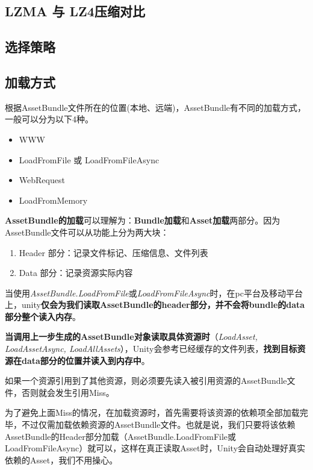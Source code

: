 \documentclass[UTF8,a4paper,12pt]{ctexbook}
\begin{document}
			\subsection{LZMA 与 LZ4压缩对比}
			
			\subsection{选择策略}
			
		\subsection{加载方式}   
			根据AssetBundle文件所在的位置(本地、远端)，AssetBundle有不同的加载方式，一般可以分为以下4种。
			\begin{itemize}
				\item WWW
				\item LoadFromFile 或 LoadFromFileAsync
				\item WebRequest
				\item LoadFromMemory
			\end{itemize} 
			
			\textbf{AssetBundle的加载}可以理解为：\textbf{Bundle加载}和\textbf{Asset加载}两部分。因为AssetBundle文件可以从功能上分为两大块：
			\begin{enumerate}
				\item Header 部分：记录文件标记、压缩信息、文件列表
				\item Data 部分：记录资源实际内容
			\end{enumerate}
			
			当使用\textit{AssetBundle.LoadFromFile}或\textit{LoadFromFileAsync}时，在pc平台及移动平台上，unity\textbf{仅会为我们读取AssetBundle的header部分，并不会将bundle的data部分整个读入内存}。
			
			\textbf{当调用上一步生成的AssetBundle对象读取具体资源时}（\textit{LoadAsset, LoadAssetAsync, LoadAllAssets}），Unity会参考已经缓存的文件列表，\textbf{找到目标资源在data部分的位置并读入到内存中}。

			如果一个资源引用到了其他资源，则必须要先读入被引用资源的AssetBundle文件，否则就会发生引用Miss。
			
			为了避免上面Miss的情况，在加载资源时，首先需要将该资源的依赖项全部加载完毕，不过仅需加载依赖资源的AssetBundle文件。也就是说，我们只要将该依赖AssetBundle的Header部分加载（AssetBundle.LoadFromFile或LoadFromFileAsync）就可以，这样在真正读取Asset时，Unity会自动处理好真实依赖的Asset，我们不用操心。
			
\end{document}
